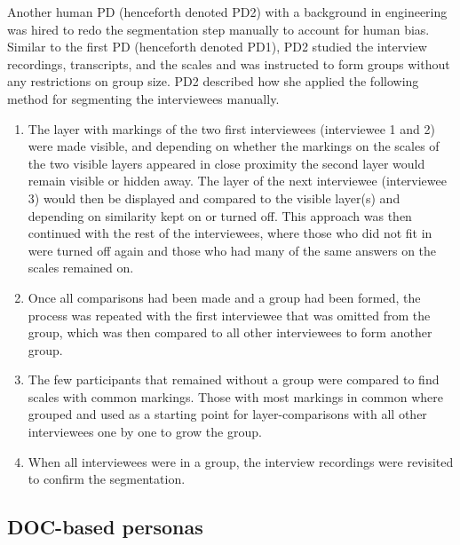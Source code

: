 Another human PD (henceforth denoted PD2) with a background in engineering was hired to redo the segmentation step manually to account for human bias. Similar to the first PD (henceforth denoted PD1), PD2 studied the interview recordings, transcripts, and the scales and was instructed to form groups without any restrictions on group size. PD2 described how she applied the following method for segmenting the interviewees manually.
\begin{enumerate}
\item The layer with markings of the two first interviewees (interviewee 1 and 2) were made visible, and depending on whether the markings on the scales of the two visible layers appeared in close proximity the second layer would remain visible or hidden away. The layer of the next interviewee (interviewee 3) would then be displayed and compared to the visible layer(s) and depending on similarity kept on or turned off. This approach was then continued with the rest of the interviewees, where those who did not fit in were turned off again and those who had many of the same answers on the scales remained on.
\item Once all comparisons had been made and a group had been formed, the process was repeated with the first interviewee that was omitted from the group, which was then compared to all other interviewees to form another group.
\item The few participants that remained without a group were compared to find scales with common markings. Those with most markings in common where grouped and used as a starting point for layer-comparisons with all other interviewees one by one to grow the group.
\item When all interviewees were in a group, the interview recordings were revisited to confirm the segmentation.
\end{enumerate}

\subsection{DOC-based personas}


